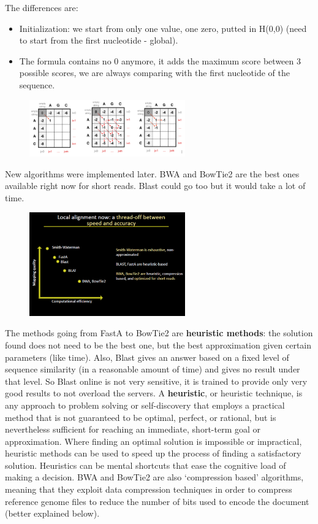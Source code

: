 The differences are:

\begin{itemize}
    \item Initialization: we start from only one value, one zero, putted in H(0,0) (need to start from the first nucleotide - global). 
    \item The formula contains no 0 anymore, it adds the maximum score between 3 possible scores, we are always comparing with the first nucleotide of the sequence. 
\end{itemize}

\begin{figure}[h]
\centering
\includegraphics[width=0.6\textwidth]{Needleman2.png}
\caption{}
\end{figure}

New algorithms were implemented later. 
BWA and BowTie2 are the best ones available right now for short reads. Blast could go too but it would take a lot of time. 

\begin{figure}[h]
\centering
\includegraphics[width=0.6\textwidth]{LocalAlignment.png}
\caption{}
\end{figure}

The methods going from FastA to BowTie2 are \textbf{heuristic methods}: the solution found does not need to be the best one, but the best approximation given certain parameters (like time). Also, Blast gives an answer based on a fixed level of sequence similarity (in a reasonable amount of time) and gives no result under that level. So Blast online is not very sensitive, it is trained to provide only very good results to not overload the servers. 
A \textbf{heuristic}, or heuristic technique, is any approach to problem solving or self-discovery that employs a practical method that is not guaranteed to be optimal, perfect, or rational, but is nevertheless sufficient for reaching an immediate, short-term goal or approximation. Where finding an optimal solution is impossible or impractical, heuristic methods can be used to speed up the process of finding a satisfactory solution. Heuristics can be mental shortcuts that ease the cognitive load of making a decision.
BWA and BowTie2 are also ‘compression based’ algorithms, meaning that they exploit data compression techniques in order to compress reference genome files to reduce the number of bits used to encode the document (better explained below).

